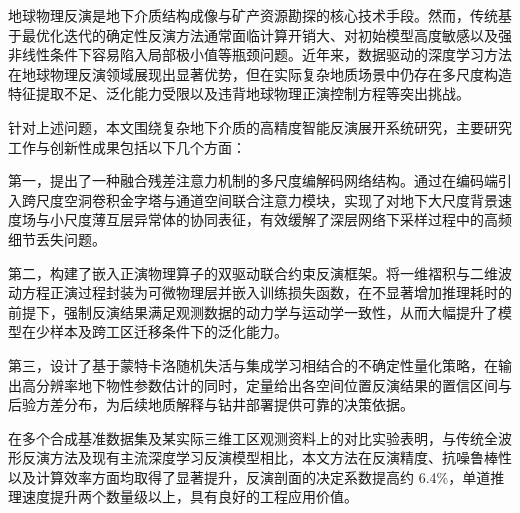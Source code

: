 \begin{abstractzh}
地球物理反演是地下介质结构成像与矿产资源勘探的核心技术手段。然而，传统基于最优化迭代的确定性反演方法通常面临计算开销大、对初始模型高度敏感以及强非线性条件下容易陷入局部极小值等瓶颈问题。近年来，数据驱动的深度学习方法在地球物理反演领域展现出显著优势，但在实际复杂地质场景中仍存在多尺度构造特征提取不足、泛化能力受限以及违背地球物理正演控制方程等突出挑战。

针对上述问题，本文围绕复杂地下介质的高精度智能反演展开系统研究，主要研究工作与创新性成果包括以下几个方面：

第一，提出了一种融合残差注意力机制的多尺度编解码网络结构。通过在编码端引入跨尺度空洞卷积金字塔与通道空间联合注意力模块，实现了对地下大尺度背景速度场与小尺度薄互层异常体的协同表征，有效缓解了深层网络下采样过程中的高频细节丢失问题。

第二，构建了嵌入正演物理算子的双驱动联合约束反演框架。将一维褶积与二维波动方程正演过程封装为可微物理层并嵌入训练损失函数，在不显著增加推理耗时的前提下，强制反演结果满足观测数据的动力学与运动学一致性，从而大幅提升了模型在少样本及跨工区迁移条件下的泛化能力。

第三，设计了基于蒙特卡洛随机失活与集成学习相结合的不确定性量化策略，在输出高分辨率地下物性参数估计的同时，定量给出各空间位置反演结果的置信区间与后验方差分布，为后续地质解释与钻井部署提供可靠的决策依据。

在多个合成基准数据集及某实际三维工区观测资料上的对比实验表明，与传统全波形反演方法及现有主流深度学习反演模型相比，本文方法在反演精度、抗噪鲁棒性以及计算效率方面均取得了显著提升，反演剖面的决定系数提高约 6.4\%，单道推理速度提升两个数量级以上，具有良好的工程应用价值。
\end{abstractzh}
